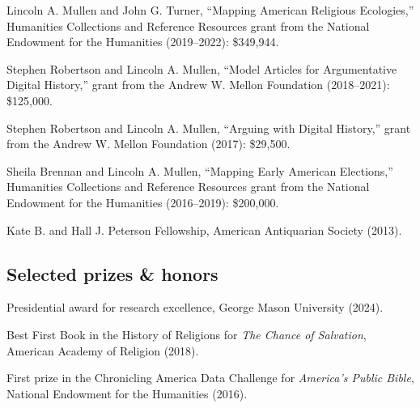 \documentclass[11pt]{article}
\providecommand{\tightlist}{%
  \setlength{\itemsep}{0pt}\setlength{\parskip}{0pt}}
\begin{document}

Lincoln A. Mullen and John G. Turner, ``Mapping American Religious Ecologies,'' Humanities Collections and Reference Resources grant from the National Endowment for the Humanities (2019--2022): \$349,944.

Stephen Robertson and Lincoln A. Mullen, ``Model Articles for Argumentative Digital History,'' grant from the Andrew W. Mellon Foundation (2018--2021): \$125,000.

Stephen Robertson and Lincoln A. Mullen, ``Arguing with Digital History,'' grant from the Andrew W. Mellon Foundation (2017): \$29,500.

Sheila Brennan and Lincoln A. Mullen, ``Mapping Early American Elections,'' Humanities Collections and Reference Resources grant from the National Endowment for the Humanities (2016--2019): \$200,000. 

Kate B. and Hall J. Peterson Fellowship, American Antiquarian Society (2013). 

\subsection{Selected prizes \& honors}\label{prizes-and-honors}

Presidential award for research excellence, George Mason University (2024).


Best First Book in the History of Religions for \emph{The Chance of Salvation}, American Academy of Religion (2018).

First prize in the Chronicling America Data Challenge for \emph{America's Public Bible}, National Endowment for the Humanities (2016).



\end{document}
